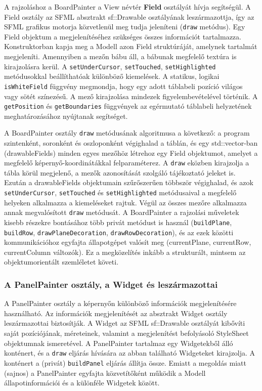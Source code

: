 \documentclass[12pt, twoside]{report}
\begin{document}
A rajzoláshoz a BoardPainter a View névtér \textbf{Field} osztályát hívja segítségül. A Field osztály az SFML absztrakt sf::Drawable osztályának leszármazottja, így az SFML grafikus motorja közvetlenül meg tudja jeleníteni ({\tt draw} metódus). Egy Field objektum a megjelenítéséhez szükséges összes információt tartalmazza. Konstruktorban kapja meg a Modell azon Field struktúráját, amelynek tartalmát megjeleníti. Amennyiben a mezőn bábu áll, a bábunak megfelelő textúra is kirajzolásra kerül. A {\tt setUnderCursor}, {\tt setTouched}, {\tt setHighlighted} metódusokkal beállíthatóak különböző kiemelések. A statikus, logikai {\tt isWhiteField} függvény megmondja, hogy egy adott táblabeli pozíció világos vagy sötét színezésű. A mező kirajzolása mindezek figyelembevételével történik. A {\tt getPosition} és {\tt getBoundaries} függvények az egérmutató táblabeli helyzetének meghatározásához nyújtanak segítséget.

A BoardPainter osztály {\tt draw} metódusának algoritmusa a következő: a program szintenként, soronként és oszloponként végighalad a táblán, és egy std::vector-ban (drawableFields) minden egyes mezőhöz létrehoz egy Field objektumot, amelyet a megfelelő képernyő-koordinátákkal felparaméterez. A {\tt draw} eközben kirajzolja a tábla körül megjelenő, a mezők azonosítását szolgáló tájékoztató jeleket is. Ezután a drawableFields objektumain szűrőszerűen többször végighalad, és azok {\tt setUnderCursor}, {\tt setTouched} és {\tt setHighlighted} metódusaival a megfelelő helyeken alkalmazza a kiemeléseket rajtuk. Végül az összes mezőre alkalmazza annak megvalósított {\tt draw} metódusát. A BoardPainter a rajzolási műveletek kisebb részekre bontásához több privát metódust is használ ({\tt buildPlane}, {\tt buildRow}, {\tt drawPlaneDecoration}, {\tt drawRowDecoration}), és az ezek közötti kommunikációhoz egyfajta állapotgépet valósít meg (currentPlane, currentRow, currentColumn változók). Ez a megközelítés inkább a strukturált, mintsem az objektumorientált szemléletet követi.

\subsubsection{A PanelPainter osztály, a Widget és leszármazottai}

A PanelPainter osztály a képernyőn különböző információk megjelenítésére használható. Az információk megjelenítését az absztrakt Widget osztály leszármazottai biztosítják. A Widget az SFML sf::Drawable osztályát kibővíti saját pozíciójának, méreteinek, valamint a megjelenítést befolyásoló StyleSheet objektumnak ismeretével. A PanelPainter tartalmaz egy Widgetekből álló konténert, és a {\tt draw} eljárás hívására az abban található Widgeteket kirajzolja. A konténert a (privát) {\tt buildPanel} eljárás állítja össze. Emiatt a megoldás miatt (sajnos) a PanelPainter egyfajta közvetítőként működik a Modell állapotinformációi és a különféle Widgetek között.
\end{document}
